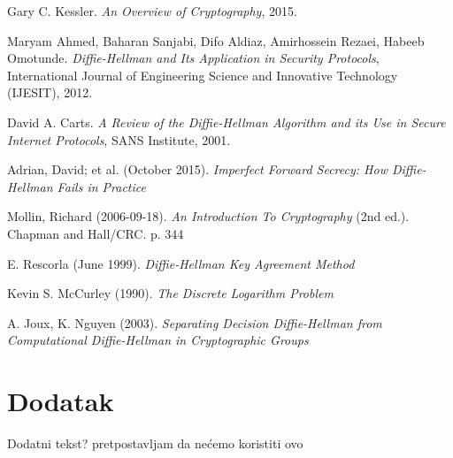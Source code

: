 \documentclass[a4paper]{article}
\begin{document}
\begin{thebibliography}{9}

 Gary C. Kessler. \emph{An Overview of Cryptography}, 2015.

 Maryam Ahmed, Baharan Sanjabi, Difo Aldiaz, Amirhossein Rezaei, Habeeb Omotunde. \emph{Diffie-Hellman and Its Application in Security Protocols}, International Journal of Engineering Science and Innovative Technology (IJESIT), 2012.

 David A. Carts. \emph{A Review of the Diffie-Hellman Algorithm and its Use in Secure Internet Protocols}, SANS Institute, 2001.

 Adrian, David; et al. (October 2015). \emph{Imperfect Forward Secrecy: How Diffie-Hellman Fails in Practice}

 Mollin, Richard (2006-09-18). \emph{An Introduction To Cryptography} (2nd ed.). Chapman and Hall/CRC. p. 344

 E. Rescorla (June 1999). \emph{Diffie-Hellman Key Agreement Method}

 Kevin S. McCurley (1990). \emph{The Discrete Logarithm Problem}

 A. Joux, K. Nguyen (2003). \emph{Separating Decision Diffie-Hellman from Computational Diffie-Hellman in Cryptographic Groups}

\end{thebibliography}


\appendix
\section{Dodatak}
Dodatni tekst? pretpostavljam da nećemo koristiti ovo 
\end{document}
